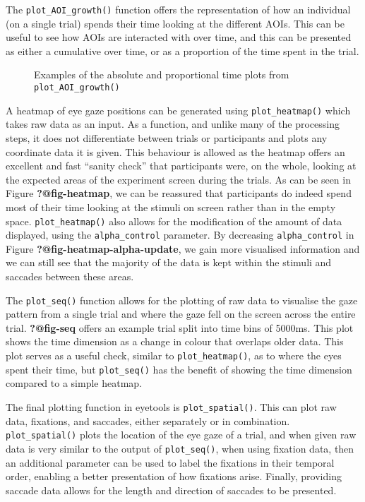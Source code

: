 \documentclass[
  man,
  floatsintext,
  longtable,
  nolmodern,
  notxfonts,
  notimes,
  colorlinks=true,linkcolor=blue,citecolor=blue,urlcolor=blue]{apa7}
\begin{document}
The \texttt{plot\_AOI\_growth()} function offers the representation of
how an individual (on a single trial) spends their time looking at the
different AOIs. This can be useful to see how AOIs are interacted with
over time, and this can be presented as either a cumulative over time,
or as a proportion of the time spent in the trial.

\begin{figure}[H]

\caption{\label{fig-growth}Examples of the absolute and proportional
time plots from \texttt{plot\_AOI\_growth()}}

\end{figure}%

A heatmap of eye gaze positions can be generated using
\texttt{plot\_heatmap()} which takes raw data as an input. As a
function, and unlike many of the processing steps, it does not
differentiate between trials or participants and plots any coordinate
data it is given. This behaviour is allowed as the heatmap offers an
excellent and fast ``sanity check'' that participants were, on the
whole, looking at the expected areas of the experiment screen during the
trials. As can be seen in Figure \textbf{?@fig-heatmap}, we can be
reassured that participants do indeed spend most of their time looking
at the stimuli on screen rather than in the empty space.
\texttt{plot\_heatmap()} also allows for the modification of the amount
of data displayed, using the \texttt{alpha\_control} parameter. By
decreasing \texttt{alpha\_control} in Figure
\textbf{?@fig-heatmap-alpha-update}, we gain more visualised information
and we can still see that the majority of the data is kept within the
stimuli and saccades between these areas.

The \texttt{plot\_seq()} function allows for the plotting of raw data to
visualise the gaze pattern from a single trial and where the gaze fell
on the screen across the entire trial. \textbf{?@fig-seq} offers an
example trial split into time bins of 5000ms. This plot shows the time
dimension as a change in colour that overlaps older data. This plot
serves as a useful check, similar to \texttt{plot\_heatmap()}, as to
where the eyes spent their time, but \texttt{plot\_seq()} has the
benefit of showing the time dimension compared to a simple heatmap.

The final plotting function in eyetools is \texttt{plot\_spatial()}.
This can plot raw data, fixations, and saccades, either separately or in
combination. \texttt{plot\_spatial()} plots the location of the eye gaze
of a trial, and when given raw data is very similar to the output of
\texttt{plot\_seq()}, when using fixation data, then an additional
parameter can be used to label the fixations in their temporal order,
enabling a better presentation of how fixations arise. Finally,
providing saccade data allows for the length and direction of saccades
to be presented.
\end{document}
